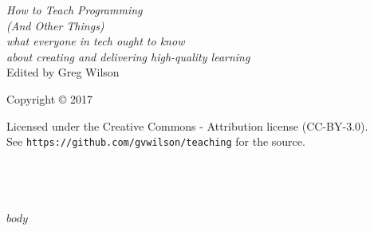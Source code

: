 \documentclass[10pt,statementpaper]{memoir}
\begin{document}
\pagestyle{empty}

{\begingroup
  \raggedleft
  \vspace*{\baselineskip}

  {\Huge\itshape How to Teach Programming \\ (And Other Things)}\\[\baselineskip]

  {\large\itshape what everyone in tech ought to know\\ about creating and delivering high-quality learning}\\[0.2\textheight]

  {\large Edited by Greg Wilson}\par

  \vfill

  {\large Copyright {\copyright} 2017}

  \vspace*{\baselineskip}

  {\tiny
    Licensed under the Creative Commons - Attribution license (CC-BY-3.0).
    \\
    See \texttt{https://github.com/gvwilson/teaching} for the source.
  }

  \vspace*{\baselineskip}

\endgroup}

\newpage

\pagestyle{empty}

~

\newpage

\tableofcontents

\newpage

\pagestyle{empty}

~

\newpage

\pagestyle{plain}

$body$
\end{document}
